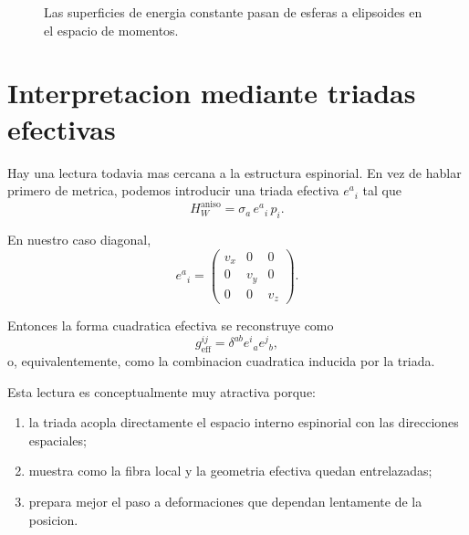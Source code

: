 \begin{figure}[h!]
\centering
{}
\caption{Las superficies de energia constante pasan de esferas a elipsoides en el espacio de momentos.}
\end{figure}

\section{Interpretacion mediante triadas efectivas}
Hay una lectura todavia mas cercana a la estructura espinorial. En vez de hablar primero de metrica, podemos introducir una triada efectiva \(e^a{}_i\) tal que
\begin{equation}
H_W^{\mathrm{aniso}} = \sigma_a\, e^a{}_i\, p_i.
\label{c22:eq:triadform}
\end{equation}

En nuestro caso diagonal,
\begin{equation}
e^a{}_i=
\begin{pmatrix}
v_x & 0 & 0\\
0 & v_y & 0\\
0 & 0 & v_z
\end{pmatrix}.
\label{c22:eq:triadDiag}
\end{equation}

Entonces la forma cuadratica efectiva se reconstruye como
\begin{equation}
g_{\mathrm{eff}}^{ij}=\delta^{ab} e^i{}_a e^j{}_b,
\end{equation}
o, equivalentemente, como la combinacion cuadratica inducida por la triada.

Esta lectura es conceptualmente muy atractiva porque:
\begin{enumerate}[label=\arabic*.]
    \item la triada acopla directamente el espacio interno espinorial con las direcciones espaciales;
    \item muestra como la fibra local y la geometria efectiva quedan entrelazadas;
    \item prepara mejor el paso a deformaciones que dependan lentamente de la posicion.
\end{enumerate}

